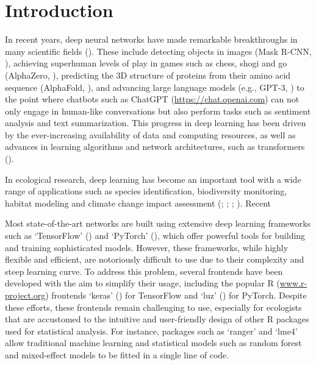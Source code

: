 \documentclass[12pt,twoside]{scrreport}
\newcommand{\pkg}[1]{`#1'}
\begin{document}
\chapter*{Introduction}
\setcounter{page}{1}
In recent years, deep neural networks have made remarkable breakthroughs in many scientific fields (\cite{jordanMachineLearningTrends2015}). These include detecting objects in images (Mask R-CNN, \cite{heMaskRCNN2017}), achieving superhuman levels of play in games such as chess, shogi and go (AlphaZero, \cite{silverMasteringChessShogi2017}), predicting the 3D structure of proteins from their amino acid sequence (AlphaFold, \cite{jumperHighlyAccurateProtein2021}), and advancing large language models (e.g., GPT-3, \cite{brownLanguageModelsAre2020}) to the point where chatbots such as ChatGPT (\url{https://chat.openai.com}) can not only engage in human-like conversations but also perform tasks such as sentiment analysis and text summarization. This progress in deep learning has been driven by the ever-increasing availability of data and computing resources, as well as advances in learning algorithms and network architectures, such as transformers (\cite{vaswaniAttentionAllYou2017}).

In ecological research, deep learning has become an important tool with a wide range of applications such as species identification, biodiversity monitoring, habitat modeling and climate change impact assessment (\cite{pichlerMachineLearningDeep2023}; \cite{borowiecDeepLearningTool2022}; \cite{tuiaPerspectivesMachineLearning2022}; \cite{christinApplicationsDeepLearning2019}). Recent 


Most state-of-the-art networks are built using extensive deep learning frameworks such as \pkg{TensorFlow} (\cite{abadiTensorFlowSystemLargeScale2016}) and \pkg{PyTorch} (\cite{paszkePyTorchImperativeStyle2019}), which offer powerful tools for building and training sophisticated models. However, these frameworks, while highly flexible and efficient, are notoriously difficult to use due to their complexity and steep learning curve. To address this problem, several frontends have been developed with the aim to simplify their usage, including the popular R (\url{www.r-project.org}) frontends \pkg{keras} (\cite{chollet2015keras}) for TensorFlow and \pkg{luz} (\cite{falbelLuzHigherLevel2024}) for PyTorch. Despite these efforts, these frontends remain challenging to use, especially for ecologists that are accustomed to the intuitive and user-friendly design of other R packages used for statistical analysis. For instance, packages such as \pkg{ranger} and \pkg{lme4} allow traditional machine learning and statistical models such as random forest and mixed-effect models to be fitted in a single line of code.
\end{document}
